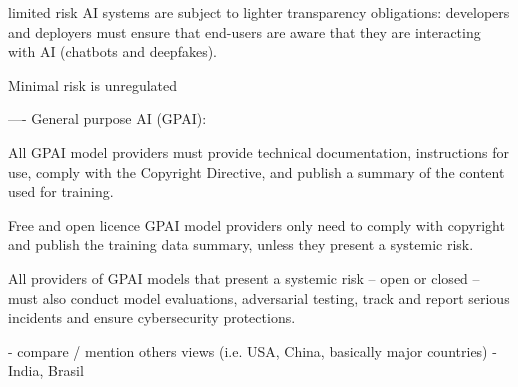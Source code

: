 limited risk AI systems are subject to lighter transparency obligations: developers and deployers must ensure that end-users are aware that they are interacting with AI (chatbots and deepfakes).

Minimal risk is unregulated

----
General purpose AI (GPAI):

All GPAI model providers must provide technical documentation, instructions for use, comply with the Copyright Directive, and publish a summary of the content used for training.

Free and open licence GPAI model providers only need to comply with copyright and publish the training data summary, unless they present a systemic risk.

All providers of GPAI models that present a systemic risk – open or closed – must also conduct model evaluations, adversarial testing, track and report serious incidents and ensure cybersecurity protections.

- compare / mention others views (i.e. USA, China, basically major countries)
- India, Brasil






